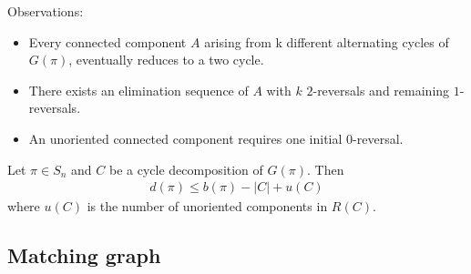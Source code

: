 \documentclass{beamer}
\theoremstyle{definition}
\def\spadding{\vspace{0.25cm}}
\begin{document}
\begin{frame}



Observations:
\begin{itemize}
    \item Every connected component $A$ arising from k different alternating cycles of $G(\pi)$, eventually reduces to a two cycle.\pause
    \item There exists an elimination sequence of $A$ with $k$ $2$-reversals and remaining $1$-reversals.\pause
    \item An unoriented connected component requires one initial $0$-reversal.
\end{itemize}\spadding\pause

\begin{theorem}
\label{thm:4}
Let $\pi \in S_n$ and $C$ be a cycle decomposition of $G(\pi)$. Then
\begin{align*}
    d(\pi) \leq b(\pi) - |C| + u(C)
\end{align*}
where $u(C)$ is the number of unoriented components in $R(C)$.
\end{theorem}

\end{frame}

\subsection{Matching graph}
\end{document}
